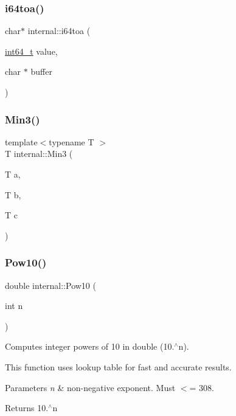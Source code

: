 \subsubsection{\texorpdfstring{i64toa()}{i64toa()}}
{\footnotesize\ttfamily char$\ast$ internal\+::i64toa (\begin{DoxyParamCaption}\item[{\hyperlink{stdint_8h_a414156feea104f8f75b4ed9e3121b2f6}{int64\+\_\+t}}]{value,  }\item[{char $\ast$}]{buffer }\end{DoxyParamCaption})\hspace{0.3cm}{\ttfamily [inline]}}

\mbox{\label{namespaceinternal_ace304441347098a4953ea99f50805da9}} 
\subsubsection{\texorpdfstring{Min3()}{Min3()}}
{\footnotesize\ttfamily template$<$typename T $>$ \\
T internal\+::\+Min3 (\begin{DoxyParamCaption}\item[{T}]{a,  }\item[{T}]{b,  }\item[{T}]{c }\end{DoxyParamCaption})\hspace{0.3cm}{\ttfamily [inline]}}

\mbox{\label{namespaceinternal_af01c41d045d596e2f8d1888cf6fbecb6}} 
\subsubsection{\texorpdfstring{Pow10()}{Pow10()}}
{\footnotesize\ttfamily double internal\+::\+Pow10 (\begin{DoxyParamCaption}\item[{int}]{n }\end{DoxyParamCaption})\hspace{0.3cm}{\ttfamily [inline]}}



Computes integer powers of 10 in double (10.$^\wedge$n). 

This function uses lookup table for fast and accurate results. 
\begin{DoxyParams}{Parameters}
{\em n} & non-\/negative exponent. Must $<$= 308. \\
\hline
\end{DoxyParams}
\begin{DoxyReturn}{Returns}
10.$^\wedge$n 
\end{DoxyReturn}
\mbox{\label{namespaceinternal_a172fb2d42a4fda6f296b1e9304177f12}} 
